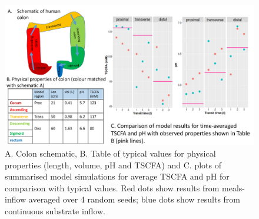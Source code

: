 \documentclass[a4paper]{article}
\begin{document}
\begin{figure}
    \centering
      \includegraphics[scale=0.35]{images/Fig1Schematic.pdf}
    \caption{A. Colon schematic, B. Table of typical values for physical properties (length, volume, pH and TSCFA) and C. plots of summarised model simulations for average TSCFA and pH for comparison with typical values. Red dots show results from meals-inflow averaged over 4 random seeds; blue dots show results from continuous substrate inflow. 
    }
    \label{fig:Validation}
\end{figure}
\end{document}
